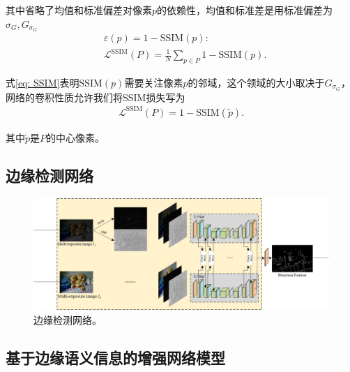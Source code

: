 \documentclass[a4paper]{ctexart}
\begin{document}
	其中省略了均值和标准偏差对像素$p$的依赖性，均值和标准差是用标准偏差为$\sigma_G,G_{\sigma_G}$
	\begin{equation}
		\begin{aligned}
			&\varepsilon(p)=1-\text{SSIM}(p): \\  &\mathcal{L}^{\text{SSIM}}(P)=\frac{1}{N}\sum_{p \in P}1-\text{SSIM}(p).
		\end{aligned}
		\label{eq: SSIM loss}
	\end{equation}
	
	式\ref{eq: SSIM}表明$\text{SSIM}(p)$需要关注像素$p$的邻域，这个领域的大小取决于$G_{\sigma_G}$，网络的卷积性质允许我们将SSIM损失写为
	\begin{equation}
		\begin{aligned}
			\mathcal{L}^{\text{SSIM}}(P)=1-\text{SSIM}(\tilde{p}).
		\end{aligned}
		\label{eq: revised_SSIM loss}
	\end{equation}
	
	其中$\tilde{p}$是$P$的中心像素。
	
	\subsection{边缘检测网络}
	
	\begin{figure}[htb]
		\centering 
		\includegraphics[width=\columnwidth]{picture/LLIE/My Architecture/Edge Detection Network}
		\caption{
			\label{fig: Edge Detection Network} 
			边缘检测网络。
		}
	\end{figure}
	
	\subsection{基于边缘语义信息的增强网络模型}
	
\end{document}
